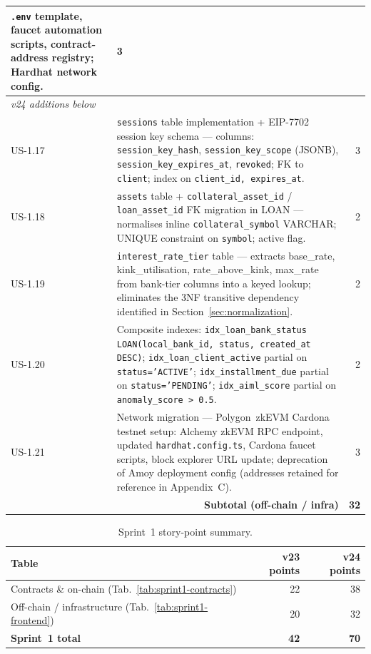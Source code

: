 \begin{table}[H]
\begin{tabular}{p{1.3cm}p{10.2cm}r}
  \texttt{.env} template, faucet automation scripts,
  contract-address registry; Hardhat network config. & 3 \\
\hline
\multicolumn{2}{l}{\textit{v24 additions below}} & \\
\hline
US-1.17 & \texttt{sessions} table implementation + EIP-7702 session key
  schema --- columns: \texttt{session\_key\_hash}, \texttt{session\_key\_scope}
  (JSONB), \texttt{session\_key\_expires\_at}, \texttt{revoked}; FK to
  \texttt{client}; index on \texttt{client\_id, expires\_at}. & 3 \\
US-1.18 & \texttt{assets} table + \texttt{collateral\_asset\_id} /
  \texttt{loan\_asset\_id} FK migration in LOAN --- normalises inline
  \texttt{collateral\_symbol} VARCHAR; UNIQUE constraint on
  \texttt{symbol}; active flag. & 2 \\
US-1.19 & \texttt{interest\_rate\_tier} table --- extracts base\_rate,
  kink\_utilisation, rate\_above\_kink, max\_rate from bank-tier columns
  into a keyed lookup; eliminates the 3NF transitive dependency identified
  in Section~\ref{sec:normalization}. & 2 \\
US-1.20 & Composite indexes: \texttt{idx\_loan\_bank\_status}
  \texttt{LOAN(local\_bank\_id, status, created\_at DESC)};
  \texttt{idx\_loan\_client\_active} partial on \texttt{status='ACTIVE'};
  \texttt{idx\_installment\_due} partial on \texttt{status='PENDING'};
  \texttt{idx\_aiml\_score} partial on \texttt{anomaly\_score > 0.5}. & 2 \\
US-1.21 & Network migration --- Polygon~zkEVM Cardona testnet
  setup: Alchemy zkEVM RPC endpoint, updated \texttt{hardhat.config.ts},
  Cardona faucet scripts, block explorer URL update; deprecation of Amoy
  deployment config (addresses retained for reference in Appendix~C). & 3 \\
\hline
\multicolumn{2}{r}{\textbf{Subtotal (off-chain / infra)}} & \textbf{32} \\
\hline
\end{tabular}
\end{table}

\begin{table}[H]
\centering
\caption{Sprint~1 story-point summary.}
\label{tab:sprint1-summary}
\small
\begin{tabular}{lrr}
\hline
\textbf{Table} & \textbf{v23 points} & \textbf{v24 points} \\
\hline
Contracts \& on-chain (Tab.~\ref{tab:sprint1-contracts})  & 22 & 38 \\
Off-chain / infrastructure (Tab.~\ref{tab:sprint1-frontend}) & 20 & 32 \\
\hline
\textbf{Sprint~1 total}            & \textbf{42} & \textbf{70} \\
\hline
\end{tabular}
\end{table}


